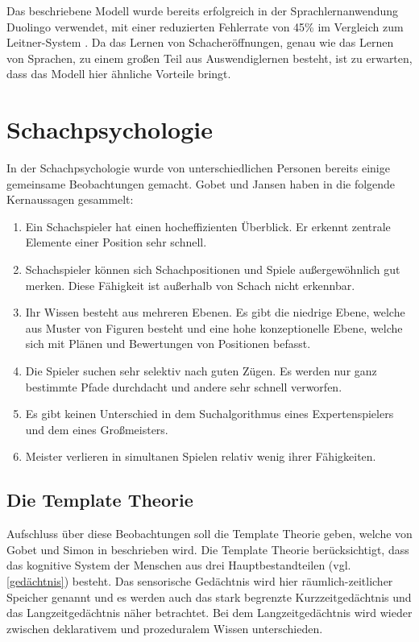 Das beschriebene Modell wurde bereits erfolgreich in der Sprachlernanwendung Duolingo verwendet, mit einer reduzierten Fehlerrate von 45\% im Vergleich zum Leitner-System \cite{settles_trainable_2016}. Da das Lernen von Schacheröffnungen, genau wie das Lernen von Sprachen, zu einem großen Teil aus Auswendiglernen besteht, ist zu erwarten, dass das Modell hier ähnliche Vorteile bringt.

\section{Schachpsychologie}\label{cp:schachpsychologie}
In der Schachpsychologie wurde von unterschiedlichen Personen bereits einige gemeinsame Beobachtungen gemacht. Gobet und Jansen haben in \cite{gobet_training_2006} die folgende Kernaussagen gesammelt:

\begin{enumerate}
    \item Ein Schachspieler hat einen hocheffizienten Überblick. Er erkennt zentrale Elemente einer Position sehr schnell.
    \item Schachspieler können sich Schachpositionen und Spiele außergewöhnlich gut merken. Diese Fähigkeit ist außerhalb von Schach nicht erkennbar.
    \item Ihr Wissen besteht aus mehreren Ebenen. Es gibt die niedrige Ebene, welche aus Muster von Figuren besteht und eine hohe konzeptionelle Ebene, welche sich mit Plänen und Bewertungen von Positionen befasst.
    \item Die Spieler suchen sehr selektiv nach guten Zügen. Es werden nur ganz bestimmte Pfade durchdacht und andere sehr schnell verworfen.
    \item Es gibt keinen Unterschied in dem Suchalgorithmus eines Expertenspielers und dem eines Großmeisters.
    \item Meister verlieren in simultanen Spielen relativ wenig ihrer Fähigkeiten.
\end{enumerate}

\subsection{Die Template Theorie}
Aufschluss über diese Beobachtungen soll die Template Theorie geben, welche von Gobet und Simon in \cite{gobet_templates_1996} beschrieben wird. Die Template Theorie berücksichtigt, dass das kognitive System der Menschen aus drei Hauptbestandteilen (vgl. \ref{gedächtnis}) besteht.
Das sensorische Gedächtnis wird hier räumlich-zeitlicher Speicher genannt und es werden auch das stark begrenzte Kurzzeitgedächtnis und das Langzeitgedächtnis näher betrachtet.
Bei dem Langzeitgedächtnis wird wieder zwischen deklarativem und prozeduralem Wissen unterschieden.
\cite{gobet_training_2006}

